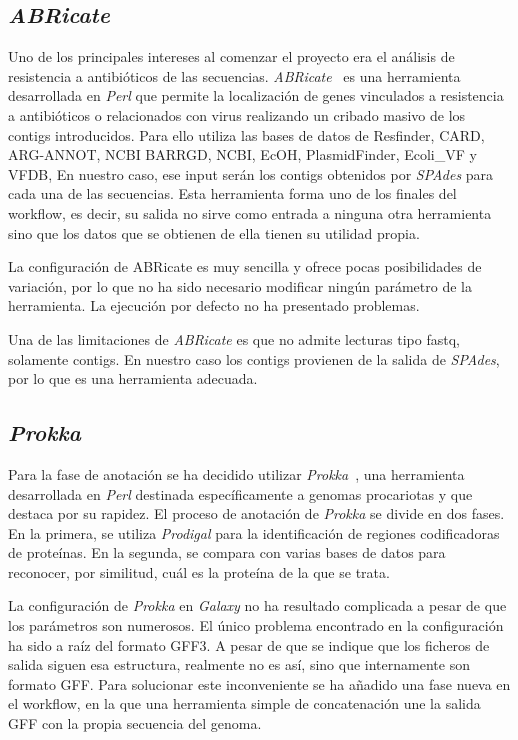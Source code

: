 \subsection{\itshape{ABRicate}}
Uno de los principales intereses al comenzar el proyecto era el análisis de resistencia a antibióticos de las secuencias. \textit{ABRicate}~\cite{seemann_:mag_right:_2019} es una herramienta desarrollada en \textit{Perl} que permite la localización de genes vinculados a resistencia a antibióticos o relacionados con virus realizando un cribado masivo de los contigs introducidos. Para ello utiliza las bases de datos de Resfinder, CARD, ARG-ANNOT, NCBI BARRGD, NCBI, EcOH, PlasmidFinder, Ecoli\_VF y VFDB, En nuestro caso, ese input serán los contigs obtenidos por \textit{SPAdes} para cada una de las secuencias. Esta herramienta forma uno de los finales del workflow, es decir, su salida no sirve como entrada a ninguna otra herramienta sino que los datos que se obtienen de ella tienen su utilidad propia.

La configuración de ABRicate es muy sencilla y ofrece pocas posibilidades de variación, por lo que no ha sido necesario modificar ningún parámetro de la herramienta. La ejecución por defecto no ha presentado problemas.

Una de las limitaciones de \textit{ABRicate} es que no admite lecturas tipo fastq, solamente contigs. En nuestro caso los contigs provienen de la salida de \textit{SPAdes}, por lo que es una herramienta adecuada.

\subsection{\itshape{Prokka}}
Para la fase de anotación se ha decidido utilizar \textit{Prokka}~\cite{Seemann2014}, una herramienta desarrollada en \textit{Perl} destinada específicamente a genomas procariotas y que destaca por su rapidez. El proceso de anotación de \textit{Prokka} se divide en dos fases. En la primera, se utiliza \textit{Prodigal} para la identificación de regiones codificadoras de proteínas. En la segunda, se compara con varias bases de datos para reconocer, por similitud, cuál es la proteína de la que se trata.

La configuración de \textit{Prokka} en \textit{Galaxy} no ha resultado complicada a pesar de que los parámetros son numerosos. El único problema encontrado en la configuración ha sido a raíz del formato GFF3. A pesar de que se indique que los ficheros de salida siguen esa estructura, realmente no es así, sino que internamente son formato GFF. Para solucionar este inconveniente se ha añadido una fase nueva en el workflow, en la que una herramienta simple de concatenación une la salida GFF con la propia secuencia del genoma.

